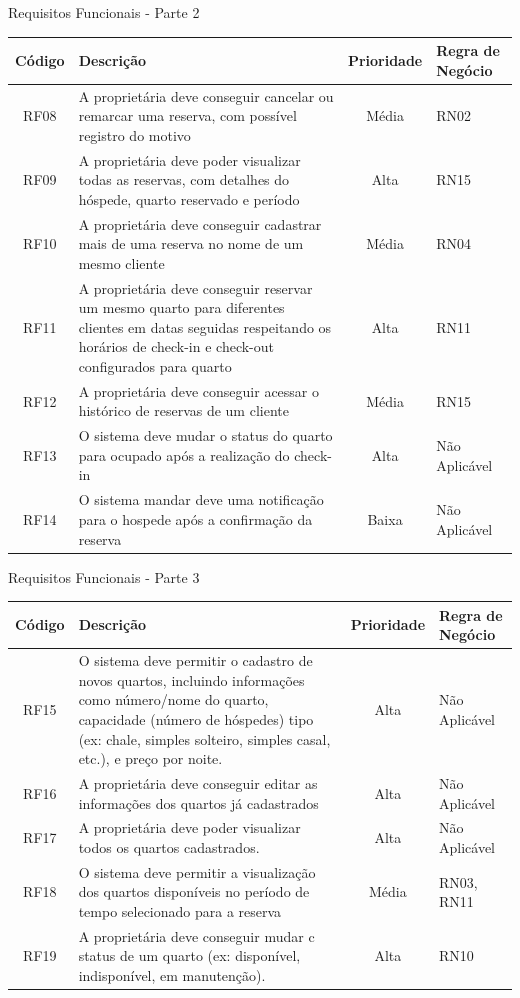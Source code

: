 \documentclass[
	12pt,				%
	openany,			%
	twoside,			%
	a4paper,			%
	english,			%
	french,				%
	spanish,			%
	brazil				%
	]{abntex2}
\begin{document}
\begin{quadro}[H]
	\caption{Requisitos Funcionais - Parte 2}
	\label{quadro_rf2}
	\begin{tabular}{|c|p{5cm}|c|p{4cm}|}
		\hline
		\textbf{Código} & \textbf{Descrição} & \textbf{Prioridade} & \textbf{Regra de Negócio} \\ \hline
		RF08 & A proprietária deve conseguir cancelar ou remarcar uma reserva, com possível registro do motivo & Média & RN02 \\ \hline
		RF09 & A proprietária deve poder visualizar todas as reservas, com detalhes do hóspede, quarto reservado e período & Alta & RN15 \\ \hline
		RF10 & A proprietária deve conseguir cadastrar mais de uma reserva no nome de um mesmo cliente & Média & RN04 \\ \hline
		RF11 & A proprietária deve conseguir reservar um mesmo quarto para diferentes clientes em datas seguidas respeitando os horários de check-in e check-out configurados para quarto & Alta & RN11 \\ \hline
		RF12 & A proprietária deve conseguir acessar o histórico de reservas de um cliente & Média & RN15 \\ \hline
		RF13 & O sistema deve mudar o status do quarto para ocupado após a realização do check-in & Alta & Não Aplicável \\ \hline
		RF14 & O sistema mandar deve uma notificação para o hospede após a confirmação da reserva & Baixa & Não Aplicável \\ \hline
	\end{tabular}
\end{quadro}
\begin{quadro}[H]
	\caption{Requisitos Funcionais - Parte 3}
	\label{quadro_rf3}
	\begin{tabular}{|c|p{5cm}|c|p{4cm}|}
		\hline
		\textbf{Código} & \textbf{Descrição} & \textbf{Prioridade} & \textbf{Regra de Negócio} \\ \hline
		RF15 & O sistema deve permitir o cadastro de novos quartos, incluindo informações como número/nome do quarto, capacidade (número de hóspedes) tipo (ex: chale, simples solteiro, simples casal, etc.), e preço por noite. & Alta & Não Aplicável \\ \hline
		RF16 & A proprietária deve conseguir editar as informações dos quartos já cadastrados & Alta & Não Aplicável \\ \hline
		RF17 & A proprietária deve poder visualizar todos os quartos cadastrados. & Alta & Não Aplicável \\ \hline
		RF18 & O sistema deve permitir a visualização dos quartos disponíveis no período de tempo selecionado para a reserva & Média & RN03, RN11 \\ \hline
		RF19 & A proprietária deve conseguir mudar c status de um quarto (ex: disponível, indisponível, em manutenção). & Alta & RN10 \\ \hline
	\end{tabular}
\end{quadro}
\end{document}
